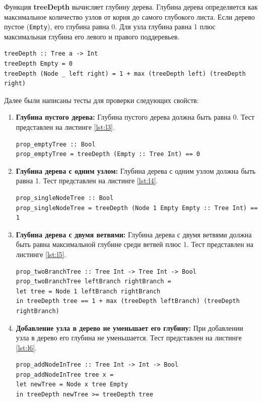 \documentclass[11pt,a4paper,final]{article} %
\begin{document}
Функция \textbf{treeDepth} вычисляет глубину дерева. Глубина дерева определяется как максимальное количество узлов от корня до самого глубокого листа. Если дерево пустое (\texttt{Empty}), его глубина равна 0. Для узла глубина равна 1 плюс максимальная глубина его левого и правого поддеревьев.

\begin{lstlisting}[caption={Функция вычисления глубины дерева}, label={lst:l2}]
treeDepth :: Tree a -> Int
treeDepth Empty = 0
treeDepth (Node _ left right) = 1 + max (treeDepth left) (treeDepth right)
\end{lstlisting}

Далее были написаны тесты для проверки следующих свойств:
\begin{enumerate}
\item \textbf{Глубина пустого дерева:} Глубина пустого дерева должна быть равна 0. Тест представлен на листинге \ref{lst:l3}.

\begin{lstlisting}[caption={Тест для проверки глубины пустого дерева}, label={lst:l3}]
prop_emptyTree :: Bool
prop_emptyTree = treeDepth (Empty :: Tree Int) == 0
\end{lstlisting}

\item \textbf{Глубина дерева с одним узлом:} Глубина дерева с одним узлом должна быть равна 1. Тест представлен на листинге \ref{lst:l4}.

\begin{lstlisting}[caption={Тест для проверки глубины дерева с одним узлом}, label={lst:l4}]
prop_singleNodeTree :: Bool
prop_singleNodeTree = treeDepth (Node 1 Empty Empty :: Tree Int) == 1
\end{lstlisting}

\item \textbf{Глубина дерева с двумя ветвями:} Глубина дерева с двумя ветвями должна быть равна максимальной глубине среди ветвей плюс 1. Тест представлен на листинге \ref{lst:l5}.

\begin{lstlisting}[caption={Тест для проверки глубины дерева с двумя ветвями}, label={lst:l5}]
prop_twoBranchTree :: Tree Int -> Tree Int -> Bool
prop_twoBranchTree leftBranch rightBranch =
let tree = Node 1 leftBranch rightBranch
in treeDepth tree == 1 + max (treeDepth leftBranch) (treeDepth rightBranch)
\end{lstlisting}

\item \textbf{Добавление узла в дерево не уменьшает его глубину:} При добавлении узла в дерево его глубина не уменьшается. Тест представлен на листинге \ref{lst:l6}.

\begin{lstlisting}[caption={Тест для проверки добавления узла в дерево}, label={lst:l6}]
prop_addNodeInTree :: Tree Int -> Int -> Bool
prop_addNodeInTree tree x =
let newTree = Node x tree Empty
in treeDepth newTree >= treeDepth tree
\end{lstlisting}
\end{enumerate}
\end{document}
